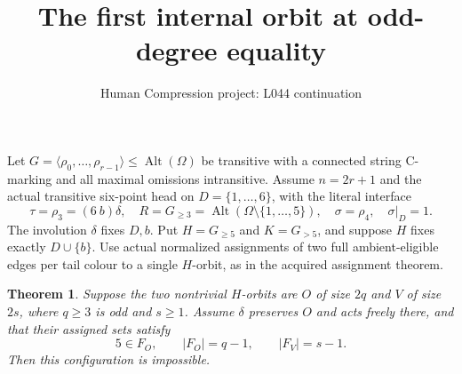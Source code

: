\documentclass[11pt,a4paper]{article}
\title{The first internal orbit at odd-degree equality}
\author{Human Compression project: L044 continuation}
\date{}
\newtheorem{theorem}{Theorem}
\newcommand{\gen}[1]{\langle#1\rangle}
\newcommand{\Alt}{\operatorname{Alt}}
\begin{document}
\maketitle
Let $G=\gen{\rho_0,\ldots,\rho_{r-1}}\le\Alt(\Omega)$
be transitive with a connected string C-marking and all
maximal omissions intransitive. Assume $n=2r+1$ and
the actual transitive six-point head on $D=\{1,\ldots,6\}$,
with the literal interface
\[
 \tau=\rho_3=(6\ b)\delta,\quad
 R=G_{\ge3}=\Alt(\Omega\setminus\{1,\ldots,5\}),\quad
 \sigma=\rho_4,\quad \sigma|_D=1.
\]
The involution $\delta$ fixes $D,b$. Put $H=G_{\ge5}$
and $K=G_{>5}$, and suppose $H$ fixes exactly $D\cup\{b\}$.
Use actual normalized assignments of two full ambient-eligible
edges per tail colour to a single $H$-orbit, as in the
acquired assignment theorem.

\begin{theorem}
Suppose the two nontrivial $H$-orbits are $O$ of size
$2q$ and $V$ of size $2s$, where $q\ge3$ is odd and
$s\ge1$. Assume $\delta$ preserves $O$ and acts freely
there, and that their assigned sets satisfy
\[
          5\in F_O,\qquad |F_O|=q-1,\qquad |F_V|=s-1.
\]
Then this configuration is impossible.
\end{theorem}
\end{document}
